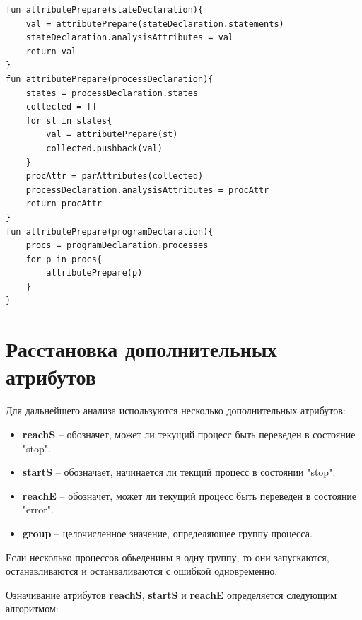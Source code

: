 \begin{lstlisting}[style=PseudoStyle,mathescape=true]
fun attributePrepare(stateDeclaration){
    val = attributePrepare(stateDeclaration.statements)
    stateDeclaration.analysisAttributes = val
    return val
}
fun attributePrepare(processDeclaration){
    states = processDeclaration.states
    collected = []
    for st in states{
        val = attributePrepare(st)
        collected.pushback(val)
    }
    procAttr = parAttributes(collected)
    processDeclaration.analysisAttributes = procAttr
    return procAttr
}
fun attributePrepare(programDeclaration){
    procs = programDeclaration.processes
    for p in procs{
        attributePrepare(p)
    }
}

\end{lstlisting}

\section{Расстановка дополнительных атрибутов}
Для дальнейшего анализа используются несколько дополнительных атрибутов:
\begin{itemize}
    \item \textbf{reachS} -- обозначет, может ли текущий процесс быть переведен в состояние "stop".
    \item \textbf{startS} -- обозначает, начинается ли текщий процесс в состоянии "stop".
    \item \textbf{reachE}  -- обозначет, может ли текущий процесс быть переведен в состояние "error".
    \item \textbf{group} -- целочисленное значение, определяющее группу процесса.
\end{itemize}

Если несколько процессов обьеденины в одну группу, то они запускаются, останавливаются и останваливаются с ошибкой одновременно.

Означивание атрибутов \textbf{reachS}, \textbf{startS} и \textbf{reachE} определяется следующим алгоритмом:

